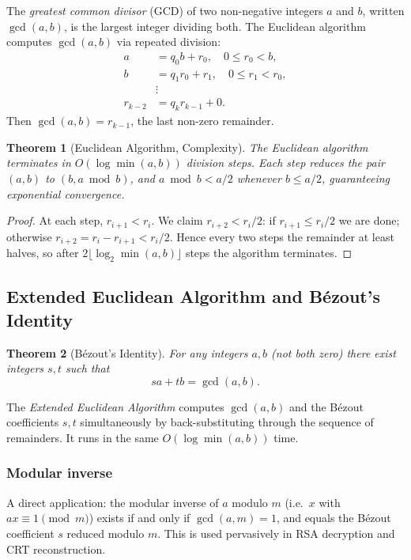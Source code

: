 \documentclass[12pt,a4paper]{amsart}
\newtheorem{theorem}{Theorem}[section]
\theoremstyle{definition}
\begin{document}
The \emph{greatest common divisor} (GCD) of two non-negative integers $a$ and
$b$, written $\gcd(a,b)$, is the largest integer dividing both. The Euclidean
algorithm computes $\gcd(a,b)$ via repeated division:
\begin{align*}
  a &= q_0 b + r_0,\quad 0 \le r_0 < b,\\
  b &= q_1 r_0 + r_1,\quad 0 \le r_1 < r_0,\\
  &\vdots\\
  r_{k-2} &= q_k r_{k-1} + 0.
\end{align*}
Then $\gcd(a,b) = r_{k-1}$, the last non-zero remainder.

\begin{theorem}[Euclidean Algorithm, Complexity]
The Euclidean algorithm terminates in $O(\log \min(a,b))$ division steps.
Each step reduces the pair $(a,b)$ to $(b, a \bmod b)$, and
$a \bmod b < a/2$ whenever $b \le a/2$, guaranteeing exponential convergence.
\end{theorem}

\begin{proof}
At each step, $r_{i+1} < r_i$. We claim $r_{i+2} < r_i/2$: if
$r_{i+1} \le r_i/2$ we are done; otherwise $r_{i+2} = r_i - r_{i+1} < r_i/2$.
Hence every two steps the remainder at least halves, so after
$2\lfloor\log_2 \min(a,b)\rfloor$ steps the algorithm terminates.
\end{proof}

\subsection{Extended Euclidean Algorithm and Bézout's Identity}

\begin{theorem}[Bézout's Identity]
For any integers $a,b$ (not both zero) there exist integers $s,t$ such that
\[
  sa + tb = \gcd(a,b).
\]
\end{theorem}

The \emph{Extended Euclidean Algorithm} computes $\gcd(a,b)$ and the
Bézout coefficients $s,t$ simultaneously by back-substituting through the
sequence of remainders. It runs in the same $O(\log\min(a,b))$ time.

\subsubsection*{Modular inverse}

A direct application: the modular inverse of $a$ modulo $m$ (i.e.\
$x$ with $ax \equiv 1 \pmod{m}$) exists if and only if $\gcd(a,m)=1$,
and equals the Bézout coefficient $s$ reduced modulo $m$. This is used
pervasively in RSA decryption and CRT reconstruction.
\end{document}
